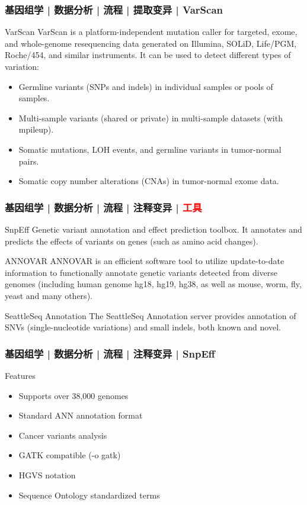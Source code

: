 \begin{frame}
  \frametitle{基因组学 | 数据分析 | 流程 | 提取变异 | VarScan}
  \begin{block}{VarScan}
    VarScan is a platform-independent mutation caller for targeted, exome, and whole-genome resequencing data generated on Illumina, SOLiD, Life/PGM, Roche/454, and similar instruments. It can be used to detect different types of variation:
    \begin{itemize}
      \item Germline variants (SNPs and indels) in individual samples or pools of samples.
      \item Multi-sample variants (shared or private) in multi-sample datasets (with mpileup).
      \item Somatic mutations, LOH events, and germline variants in tumor-normal pairs.
      \item Somatic copy number alterations (CNAs) in tumor-normal exome data.
    \end{itemize}
  \end{block}
\end{frame}

\begin{frame}
  \frametitle{基因组学 | 数据分析 | 流程 | 注释变异 | \textcolor{red}{工具}}
  \begin{block}{SnpEff}
    Genetic variant annotation and effect prediction toolbox. It annotates and predicts the effects of variants on genes (such as amino acid changes). 
  \end{block}
  \pause
  \begin{block}{ANNOVAR}
    ANNOVAR is an efficient software tool to utilize update-to-date information to functionally annotate genetic variants detected from diverse genomes (including human genome hg18, hg19, hg38, as well as mouse, worm, fly, yeast and many others).
  \end{block}
  \pause
  \begin{block}{SeattleSeq Annotation}
    The SeattleSeq Annotation server provides annotation of SNVs (single-nucleotide variations) and small indels, both known and novel.
  \end{block}
\end{frame}

\begin{frame}
  \frametitle{基因组学 | 数据分析 | 流程 | 注释变异 | SnpEff}
  \begin{block}{Features}
    \begin{itemize}
      \item Supports over 38,000 genomes
      \item Standard ANN annotation format
      \item Cancer variants analysis
      \item GATK compatible (-o gatk)
      \item HGVS notation
      \item Sequence Ontology standardized terms 
    \end{itemize}
  \end{block}
\end{frame}


